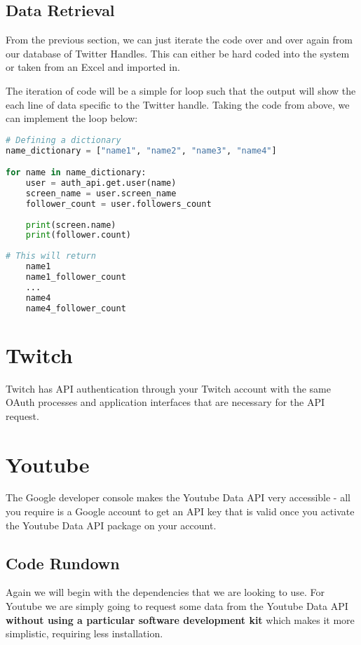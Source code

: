 \documentclass[12pt, letterpaper]{article}
\begin{document}
\subsection{Data Retrieval}
From the previous section, we can just iterate the code over and over again from our database of Twitter Handles. This can either be hard coded into the system or taken from an Excel and imported in.

The iteration of code will be a simple for loop such that the output will show the each line of data specific to the Twitter handle. Taking the code from above, we can implement the loop below:

\begin{lstlisting}[language=python]
# Defining a dictionary
name_dictionary = ["name1", "name2", "name3", "name4"]

for name in name_dictionary:
	user = auth_api.get.user(name)
	screen_name = user.screen_name
	follower_count = user.followers_count
	
	print(screen.name)
	print(follower.count)
	
# This will return
	name1
	name1_follower_count
	...
	name4
	name4_follower_count

\end{lstlisting}

\newpage
\section{Twitch}
Twitch has API authentication through your Twitch account with the same OAuth processes and application interfaces that are necessary for the API request.


\newpage
\section{Youtube}
The Google developer console makes the Youtube Data API very accessible - all you require is a Google account to get an API key that is valid once you activate the Youtube Data API package on your account.
\subsection{Code Rundown}
Again we will begin with the dependencies that we are looking to use. For Youtube we are simply going to request some data from the Youtube Data API \textbf{without using a particular software development kit} which makes it more simplistic, requiring less installation.
\end{document}
